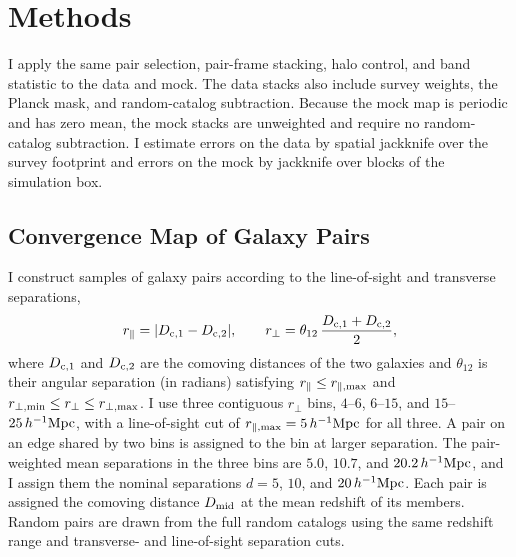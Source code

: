 \documentclass[11pt,letterpaper]{article}
\newcommand{\hinvMpc}{h^{-1}{\rm Mpc}}
\begin{document}


\section{Methods}
\label{sec:method}

I apply the same pair selection, pair-frame stacking, halo control, and band
statistic to the data and mock. The data stacks also include survey weights,
the Planck mask, and random-catalog subtraction. Because the mock map is
periodic and has zero mean, the mock stacks are unweighted and require no
random-catalog subtraction. I estimate errors on the data by spatial
jackknife over the survey footprint and errors on the mock by jackknife over
blocks of the simulation box.

\subsection{Convergence Map of Galaxy Pairs}
\label{sec:pairs}

I construct samples of galaxy pairs according to the line-of-sight and transverse separations,
\begin{equation}
  r_{\parallel} = |D_{{\rm c},1}-D_{{\rm c},2}|, \qquad
  r_{\perp} = \theta_{12}\,\frac{D_{{\rm c},1}+D_{{\rm c},2}}{2},
  \label{eq:separations}
\end{equation}
where $D_{\rm c,1}$ and $D_{\rm c,2}$ are the comoving distances of the two galaxies and $\theta_{12}$ is their angular separation (in radians) satisfying $r_{\parallel}\leq r_{\parallel,{\rm max}}$ and
$r_{\perp,{\rm min}}\leq r_{\perp}\leq r_{\perp,{\rm max}}$.
I use three contiguous $r_\perp$ bins, $4$--$6$, $6$--$15$, and $15$--$25\,\hinvMpc$, with a line-of-sight cut of $r_{\parallel,{\rm max}}=5\,\hinvMpc$ for all three. A pair on an edge shared by two bins is assigned to the bin at larger separation. The pair-weighted mean separations in the three bins are $5.0$, $10.7$, and $20.2\,\hinvMpc$, and I assign them the nominal separations $d=5$, $10$, and $20\,\hinvMpc$. Each pair is assigned the comoving distance $D_{\rm mid}$ at the mean redshift of its members. Random pairs are drawn from the full random catalogs using the same redshift range and transverse- and line-of-sight separation cuts.
\end{document}
